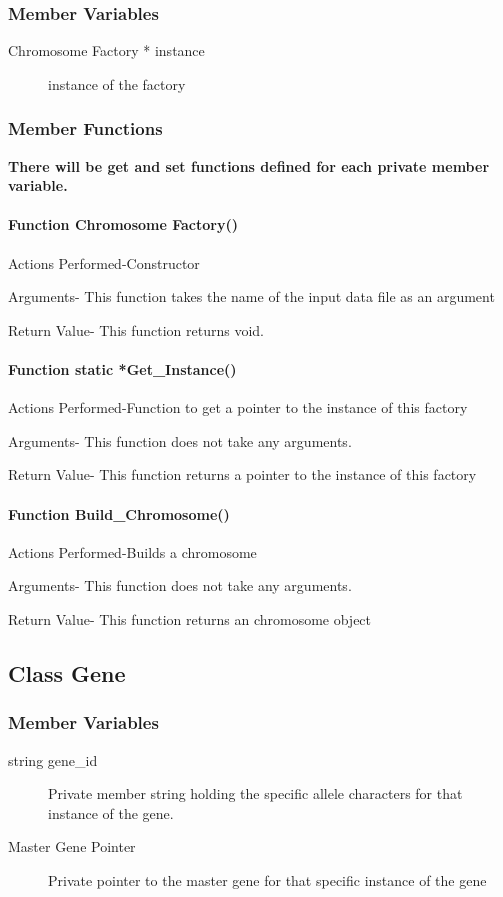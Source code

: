 \documentclass{article}
\begin{document}
\subsubsection{Member Variables}
\begin{description}
\item[Chromosome Factory * instance] instance of the factory
\end{description}
\subsubsection{Member Functions}
\textbf{There will be get and set functions defined for each private member variable.}

\paragraph{Function Chromosome Factory()}
Actions Performed-Constructor
                 
Arguments- This function takes the name of the input data file as an argument
                    
Return Value-  This function returns void.

\paragraph{Function static *Get\_Instance()}
Actions Performed-Function to get a pointer to the instance of this factory
                 
Arguments- This function does not take any arguments.
                    
Return Value- This function returns a pointer to the instance of this factory

\paragraph{Function Build\_Chromosome()}
Actions Performed-Builds a chromosome
                 
Arguments- This function does not take any arguments.
                    
Return Value- This function returns an chromosome object
\newpage
\subsection{Class Gene}
\subsubsection{Member Variables}
\begin{description}
\item[string gene\_id] Private member string holding the specific allele characters for that instance of the gene.
\item[Master Gene Pointer] Private pointer to the master gene for that specific instance of the gene
\end{description}
\end{document}
